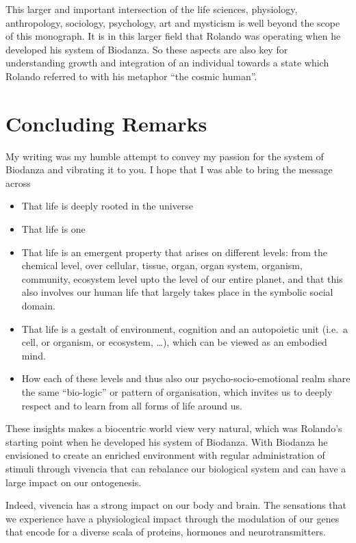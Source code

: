 \documentclass[
  11pt,
]{book}
\begin{document}
This larger and important intersection of the life sciences, physiology, anthropology, sociology, psychology, art and mysticism is well beyond the scope of this monograph. It is in this larger field that Rolando was operating when he developed his system of Biodanza. So these aspects are also key for understanding growth and integration of an individual towards a state which Rolando referred to with his metaphor ``the cosmic human''.

\hypertarget{concluding-remarks}{%
\chapter{Concluding Remarks}\label{concluding-remarks}}

My writing was my humble attempt to convey my passion for the system of Biodanza and vibrating it to you. I hope that I was able to bring the message across

\begin{itemize}
\item
  That life is deeply rooted in the universe
\item
  That life is one
\item
  That life is an emergent property that arises on different levels: from the chemical level, over cellular, tissue, organ, organ system, organism, community, ecosystem level upto the level of our entire planet, and that this also involves our human life that largely takes place in the symbolic social domain.
\item
  That life is a gestalt of environment, cognition and an autopoietic unit (i.e.~a cell, or organism, or ecosystem, \ldots), which can be viewed as an embodied mind.
\item
  How each of these levels and thus also our psycho-socio-emotional realm share the same ``bio-logic'' or pattern of organisation, which invites us to deeply respect and to learn from all forms of life around us.
\end{itemize}

These insights makes a biocentric world view very natural, which was Rolando's starting point when he developed his system of Biodanza. With Biodanza he envisioned to create an enriched environment with regular administration of stimuli through vivencia that can rebalance our biological system and can have a large impact on our ontogenesis.

Indeed, vivencia has a strong impact on our body and brain. The sensations that we experience have a physiological impact through the modulation of our genes that encode for a diverse scala of proteins, hormones and neurotransmitters.
\end{document}
